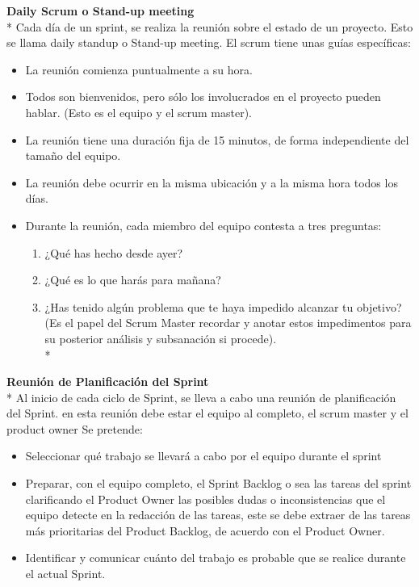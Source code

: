 \documentclass[../pfc.tex]{subfiles}
\begin{document}
	\textbf{Daily Scrum o Stand-up meeting}\\*
	Cada día de un sprint, se realiza la reunión sobre el estado de un proyecto. Esto se llama daily standup o Stand-up meeting. El scrum tiene unas guías específicas:
	\begin{itemize} 
		\item La reunión comienza puntualmente a su hora. 
		\item Todos son bienvenidos, pero sólo los involucrados en el proyecto pueden hablar. (Esto es el equipo y el scrum master). 
		\item La reunión tiene una duración fija de 15 minutos, de forma independiente del tamaño del equipo.
		\item La reunión debe ocurrir en la misma ubicación y a la misma hora todos los días.
		\item Durante la reunión, cada miembro del equipo contesta a tres preguntas:
		\begin{enumerate}
			\item ¿Qué has hecho desde ayer?
			\item ¿Qué es lo que harás para mañana?
			\item ¿Has tenido algún problema que te haya impedido alcanzar tu objetivo? (Es el papel del Scrum Master recordar y anotar estos impedimentos para su posterior análisis y subsanación si procede).\\*
		\end{enumerate} 
	\end{itemize}
	
	\textbf{Reunión de Planificación del Sprint}\\*
	Al inicio de cada ciclo de Sprint, se lleva a cabo una reunión de planificación del Sprint. en esta reunión debe estar el equipo al completo, el scrum master y el product owner Se pretende:
	\begin{itemize} 
		\item Seleccionar qué trabajo se llevará a cabo por el equipo durante el sprint 
		\item Preparar, con el equipo completo, el Sprint Backlog o sea las tareas del sprint clarificando el Product Owner las posibles dudas o  inconsistencias que el equipo detecte en la redacción de las tareas, este se debe extraer de las tareas más prioritarias del Product Backlog, de acuerdo con el Product Owner. 
		\item Identificar y comunicar cuánto del trabajo es probable que se realice durante el actual Sprint.
	\end{itemize}
	
\end{document}
